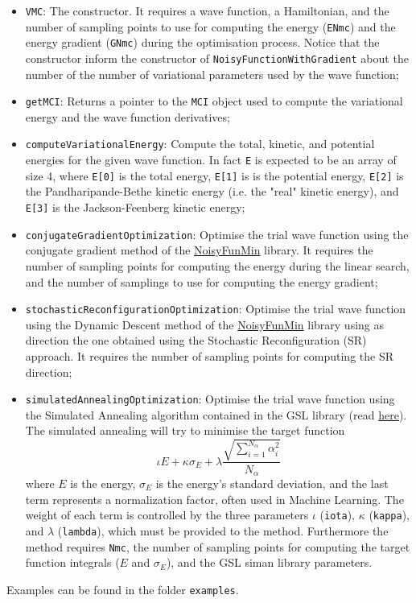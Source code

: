 \documentclass[11pt,a4paper,twoside]{article}
\begin{document}
\begin{itemize}
\item \verb+VMC+: The constructor. It requires a wave function, a Hamiltonian, and the number of sampling points to use for computing the energy (\verb+ENmc+) and the energy gradient (\verb+GNmc+) during the optimisation process. Notice that the constructor inform the constructor of \verb+NoisyFunctionWithGradient+ about the number of the number of variational parameters used by the wave function;
\item \verb+getMCI+: Returns a pointer to the \verb+MCI+ object used to compute the variational energy and the wave function derivatives;
\item \verb+computeVariationalEnergy+: Compute the total, kinetic, and potential energies for the given wave function. In fact \verb+E+ is expected to be an array of size 4, where \verb+E[0]+ is the total energy, \verb+E[1]+ is is the potential energy, \verb+E[2]+ is the Pandharipande-Bethe kinetic energy (i.e. the "real" kinetic energy), and \verb+E[3]+ is the Jackson-Feenberg kinetic energy;
\item \verb+conjugateGradientOptimization+: Optimise the trial wave function using the conjugate gradient method of the \href{https://github.com/francesco086/NoisyFunMin}{NoisyFunMin} library. It requires the number of sampling points for computing the energy during the linear search, and the number of samplings to use for computing the energy gradient;
\item \verb+stochasticReconfigurationOptimization+: Optimise the trial wave function using the Dynamic Descent method of the \href{https://github.com/francesco086/NoisyFunMin}{NoisyFunMin} library using as direction the one obtained using the Stochastic Reconfiguration (SR) approach. It requires the number of sampling points for computing the SR direction;
\item \verb+simulatedAnnealingOptimization+: Optimise the trial wave function using the Simulated Annealing algorithm contained in the GSL library (read \href{https://www.gnu.org/software/gsl/doc/html/siman.html}{here}). The simulated annealing will try to minimise the target function
  $$
  \iota E + \kappa \sigma_E + \lambda \frac{\sqrt{ \sum_{i=1}^{N_{\alpha}} \alpha_i^2 }}{N_{\alpha}}
  $$
  where $E$ is the energy, $\sigma_E$ is the energy's standard deviation, and the last term represents a normalization factor, often used in Machine Learning. The weight of each term is controlled by the three parameters $\iota$ (\verb+iota+), $\kappa$ (\verb+kappa+), and $\lambda$ (\verb+lambda+), which must be provided to the method. Furthermore the method requires \verb+Nmc+, the number of sampling points for computing the target function integrals ($E$ and $\sigma_E$), and the GSL siman library parameters.
\end{itemize}

Examples can be found in the folder \verb+examples+.





\printindex
\end{document}
